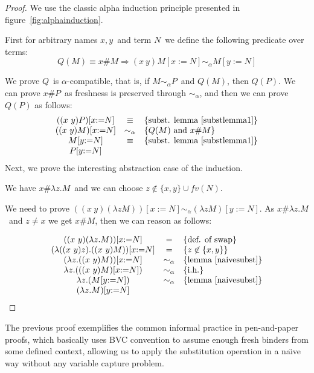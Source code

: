 \documentclass[preprint,10pt]{sigplanconf}
\newcommand{\alp}{\ensuremath{\alpha}}
\newcommand{\lam}{\ensuremath{\lambda}}
\newcommand{\alpsym}{\ensuremath{\sim_\alpha}}
\begin{document}
\begin{proof} 
We use the classic alpha induction principle presented in figure~\ref{fig:alphainduction}.

First for  arbitrary names $x,y$\  and term $N$\ we define the following predicate over terms:
\[ Q(M) \equiv x \# M \Rightarrow  (x\ y) M [x{:=}N] \alpsym  M [y{:=} N] \]

We prove $Q$\ is \alp-compatible, that is, if $M{\alpsym}P$\ and $Q(M)$, then $Q(P)$.
 We can prove $x \# P$\ as freshness is preserved through \alpsym, and then we can prove $Q(P)$ as follows:
\[
\begin{array}{ccl}
         (( x\ y) P) [ x {:=} N ] &\equiv& \{\text{subst. lemma~\ref{substlemma1}} \}\\
         ((x\ y) M) [ x {:=}  N ] &\alpsym& \{ Q(M) \ \text{and } x \# M \}\\
         M [ y {:=} N ] &\equiv& \{\text{subst. lemma~\ref{substlemma1}}\} \\ 
         P [ y {:=} N ]
\end{array}
\]
Next, we prove the interesting abstraction case of the induction.

We have $x \# \lam z. M$\ and we can choose $z \not\in \{x,y\} \cup fv(N)$.

We need to prove $((x\ y) (\lam z M )) [x{:=} N] \alpsym (\lam z M) [ y {:=}  N]$. As $x \# \lam z. M$\ and $z \not= x$ we get $x \# M$, then we can reason as follows: 


    \[ \begin{array}{ccl}
      ((x\ y) (\lam z. M)) [x {:=} N] &=& \{{\text{def. of swap}}  \}\\
      (\lam ((x\ y) z). ((x\ y) M)) [x {:=} N] &=& \{ z \not\in \{x,y\}  \}\\
      (\lam z. ((x\ y) M)) [x {:=} N] &\alpsym& \{ \text{lemma~\ref{naivesubst}} \} \\
      \lam z. (((x\ y) M) [x {:=} N])  &\alpsym& \{\text{i.h.}\}\\
      \lam z. (M [y {:=} N])  &\alpsym& \{ \text{lemma~\ref{naivesubst}} \} \\
      (\lam z. M)  [y {:=} N]
    \end{array} \]
    

\end{proof}

The previous proof exemplifies the common informal practice in pen-and-paper proofs, which basically uses BVC convention to assume enough fresh binders from some defined context, allowing us to apply the substitution operation in a na\"\i ve way without any variable capture problem. 
\end{document}
